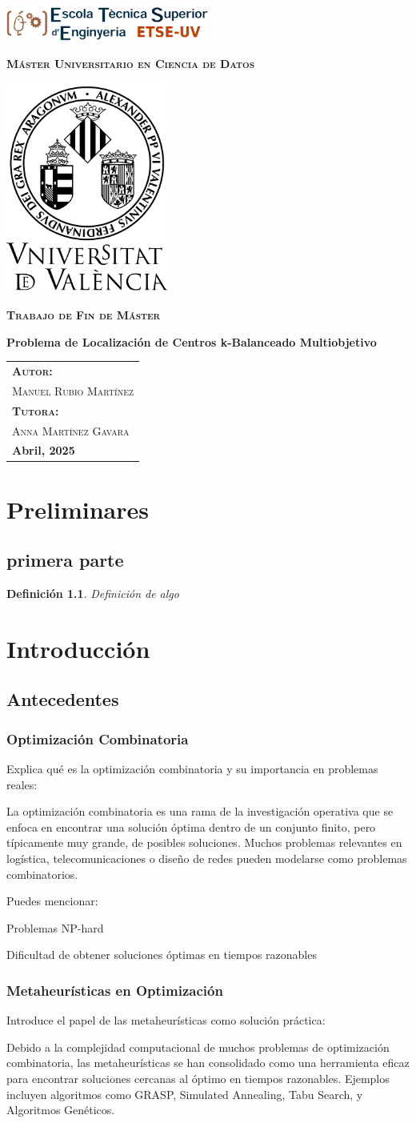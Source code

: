 \documentclass[12pt,a4paper]{book}
\newtheorem{defi}{Definición}[section]
\newcommand{\nuevaportada}[6]{
    \thispagestyle{empty}
    \begin{center}
        \includegraphics[width=0.5\textwidth]{images/logo.png}
        
        \vspace{0.5cm}
        {\Large\bfseries\textsc{M\'aster Universitario en #1}\par}
        
        \vspace{0.5cm}
        \includegraphics[width=0.4\textwidth]{images/uv.png}
        
        \vspace{0.5cm}
        {\Large\bfseries\textsc{Trabajo de Fin de M\'aster}\par}
        
        \vspace{0.5cm}
        {\Large\bfseries #2\par}
        
        \vspace{2cm}
        \begin{flushright}
            \begin{tabular}{l} 
                {\large\bfseries\textsc{Autor:}} \\
                {\large\textsc{#3}} \\ [0.5cm] 
                {\large\bfseries\textsc{Tutora:}} \\ 
                {\large\textsc{#4}} \\ [0.5cm]
                {\large\bfseries #5} 
            \end{tabular}
        \end{flushright}
    \end{center}
    \clearpage
}
\begin{document}
\nuevaportada{Ciencia de Datos}{Problema de Localización de Centros k-Balanceado Multiobjetivo}{Manuel Rubio Martínez}{Anna Martínez Gavara}{Abril, 2025}

\clearpage

\newpage
\tableofcontents

\chapter{Preliminares}
\section{primera parte}

\begin{defi}
Definición de algo
\end{defi}

\bigskip

\chapter{Introducción}

\section{Antecedentes}
\subsection{Optimización Combinatoria}

Explica qué es la optimización combinatoria y su importancia en problemas reales:

La optimización combinatoria es una rama de la investigación operativa que se enfoca en encontrar una solución óptima dentro de un conjunto finito, pero típicamente muy grande, de posibles soluciones. Muchos problemas relevantes en logística, telecomunicaciones o diseño de redes pueden modelarse como problemas combinatorios.

Puedes mencionar:

Problemas NP-hard

Dificultad de obtener soluciones óptimas en tiempos razonables
\subsection{Metaheurísticas en Optimización}
Introduce el papel de las metaheurísticas como solución práctica:

Debido a la complejidad computacional de muchos problemas de optimización combinatoria, las metaheurísticas se han consolidado como una herramienta eficaz para encontrar soluciones cercanas al óptimo en tiempos razonables. Ejemplos incluyen algoritmos como GRASP, Simulated Annealing, Tabu Search, y Algoritmos Genéticos.
\end{document}
